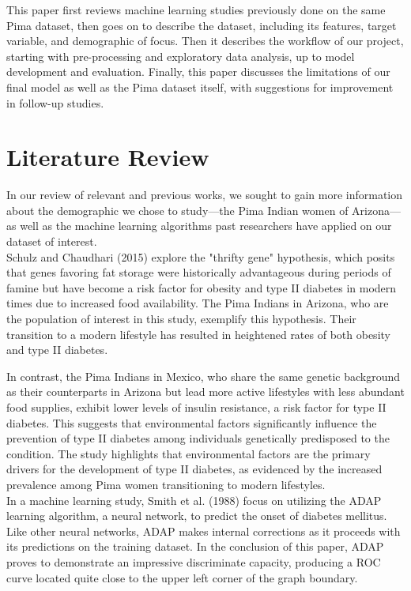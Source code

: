 \documentclass[journal]{IEEEtran}
\begin{document}
This paper first reviews machine learning studies previously done on the same Pima dataset, then goes on to describe the dataset, including its features, target variable, and demographic of focus. Then it describes the workflow of our project, starting with pre-processing and exploratory data analysis, up to model development and evaluation. Finally, this paper discusses the limitations of our final model as well as the Pima dataset itself, with suggestions for improvement in follow-up studies.


\section{Literature Review}
In our review of relevant and previous works, we sought to gain more information about the demographic we chose to study—the Pima Indian women of Arizona—as well as the machine learning algorithms past researchers have applied on our dataset of interest.\\

Schulz and Chaudhari (2015) explore the "thrifty gene" hypothesis, which posits that genes favoring fat storage were historically advantageous during periods of famine but have become a risk factor for obesity and type II diabetes in modern times due to increased food availability. The Pima Indians in Arizona, who are the population of interest in this study, exemplify this hypothesis. Their transition to a modern lifestyle has resulted in heightened rates of both obesity and type II diabetes.

In contrast, the Pima Indians in Mexico, who share the same genetic background as their counterparts in Arizona but lead more active lifestyles with less abundant food supplies, exhibit lower levels of insulin resistance, a risk factor for type II diabetes. This suggests that environmental factors significantly influence the prevention of type II diabetes among individuals genetically predisposed to the condition. The study highlights that environmental factors are the primary drivers for the development of type II diabetes, as evidenced by the increased prevalence among Pima women transitioning to modern lifestyles. \\

In a machine learning study, Smith et al. (1988) focus on utilizing the ADAP learning algorithm, a neural network, to predict the onset of diabetes mellitus. Like other neural networks, ADAP makes internal corrections as it proceeds with its predictions on the training dataset. In the conclusion of this paper, ADAP proves to demonstrate an impressive discriminate capacity, producing a ROC curve located quite close to the upper left corner of the graph boundary. 
\end{document}
